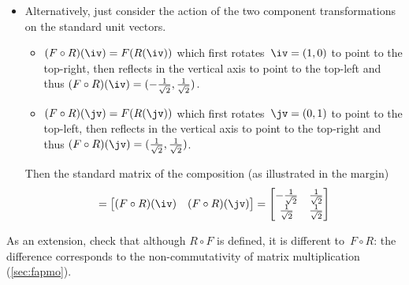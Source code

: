 \begin{example}
\begin{solution}
\begin{itemize}
\item Alternatively, just consider the action of the two component transformations on the standard unit vectors.
\begin{itemize}
\item \((F\circ R)(\iv)=F(R(\iv))\) which first rotates~\(\iv=(1,0)\) to point to the top-right, then reflects in the vertical axis to point to the top-left and thus \((F\circ R)(\iv)=(-\rt,\rt)\).
\item \((F\circ R)(\jv)=F(R(\jv))\) which first rotates~\(\jv=(0,1)\) to point to the top-left, then reflects in the vertical axis to point to the top-right and thus \((F\circ R)(\jv)=(\rt,\rt)\).
\end{itemize}
Then the standard matrix of the composition (as illustrated in the margin)
%
\begin{equation*}
[F\circ R]=\begin{bmatrix}(F\circ R)(\iv)&(F\circ R)(\jv)  \end{bmatrix}
=\begin{bmatrix} -\rt&\rt\\\rt&\rt \end{bmatrix}
\end{equation*}
\end{itemize}
\end{solution}
As an extension, check that although \(R\circ F\) is defined, it is different to~\(F\circ R\): the difference corresponds to the non-commutativity of matrix multiplication (\autoref{sec:fapmo}).
\end{example}



